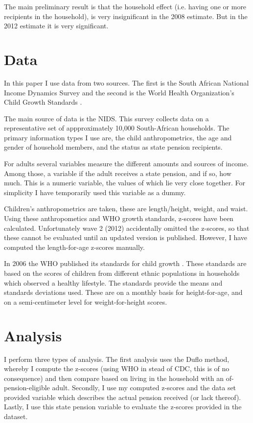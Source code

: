 \documentclass[a4paper]{report}
\begin{document}
\begin{refsection}
The main preliminary result is that the household effect (i.e. having one or more recipients in the household),
is very insignificant in the 2008 estimate.
But in the 2012 estimate it is very significant.

\section{Data}
In this paper I use data from two sources.
The first is the South African National Income Dynamics Survey \parencite[NIDS]{saldru2008nids, saldru2012nids, saldru2013nids} and the second is the World Health Organization's Child Growth Standards \parencite[WHO]{who2006child}.

The main source of data is the NIDS.
This survey collects data on a representative set of appproximately 10,000 South-African households.
The primary information types I use are, the child anthropometrics, the age and gender of household members, and the status as state pension recipients.

For adults several variables measure the different amounts and sources of income.
Among those, a variable if the adult receives a state pension, and if so, how much.
This is a numeric variable, the values of which lie very close together.
For simplicity I have temporarily used this variable as a dummy.

Children's anthropometrics are taken, these are length/height, weight, and waist.
Using these anthropometics and WHO growth standards, z-scores have been calculated.
Unfortunately wave 2 (2012) accidentally omitted the z-scores, so that these cannot be evaluated until an updated version is published.
However, I have computed the length-for-age z-scores manually.

In 2006 the WHO published its standards for child growth \parencite{who2006child}.
These standards are based on the scores of children from different ethnic populations in households which observed a healthy lifestyle.
The standards provide the means and standards deviations used. 
These are on a monthly basis for height-for-age, and on a semi-centimeter level for weight-for-height scores.

\section{Analysis}
\label{analysis}
I perform three types of analysis.
The first analysis uses the Duflo method, whereby I compute the z-scores (using WHO in stead of CDC, this is of no consequence) and then compare based on living in the household with an of-pension-eligible adult.
Secondly, I use my computed z-scores and the data set provided variable which describes the actual pension received (or lack thereof).
Lastly, I use this state pension variable to evaluate the z-scores provided in the dataset.


\end{refsection}
\end{document}
